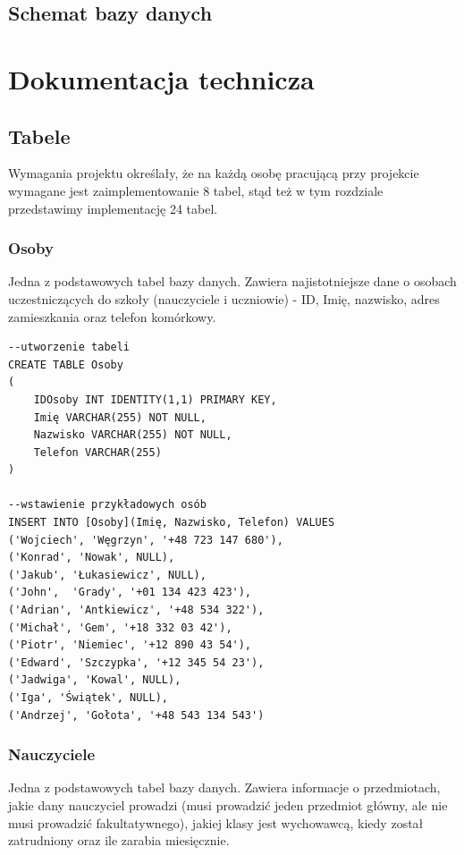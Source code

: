 \documentclass[60pt]{article}
\begin{document}
\subsection{Schemat bazy danych}

\newpage
\section{Dokumentacja technicza}

\subsection{Tabele}

Wymagania projektu określały, że na każdą osobę pracującą przy projekcie wymagane jest zaimplementowanie 8 tabel, stąd też w tym rozdziale przedstawimy implementację 24 tabel.

\subsubsection{Osoby}
Jedna z podstawowych tabel bazy danych. Zawiera najistotniejsze dane o osobach uczestniczących do szkoły (nauczyciele i uczniowie) - ID, Imię, nazwisko, adres zamieszkania oraz telefon komórkowy.

\begin{verbatim}
--utworzenie tabeli
CREATE TABLE Osoby
(
	IDOsoby INT IDENTITY(1,1) PRIMARY KEY,
	Imię VARCHAR(255) NOT NULL,
	Nazwisko VARCHAR(255) NOT NULL,
	Telefon VARCHAR(255)
)

--wstawienie przykładowych osób
INSERT INTO [Osoby](Imię, Nazwisko, Telefon) VALUES
('Wojciech', 'Węgrzyn', '+48 723 147 680'),
('Konrad', 'Nowak', NULL),
('Jakub', 'Łukasiewicz', NULL),
('John',  'Grady', '+01 134 423 423'),
('Adrian', 'Antkiewicz', '+48 534 322'),
('Michał', 'Gem', '+18 332 03 42'),
('Piotr', 'Niemiec', '+12 890 43 54'), 
('Edward', 'Szczypka', '+12 345 54 23'), 
('Jadwiga', 'Kowal', NULL), 
('Iga', 'Świątek', NULL), 
('Andrzej', 'Gołota', '+48 543 134 543')

\end{verbatim}

\subsubsection{Nauczyciele}
 Jedna z podstawowych tabel bazy danych. Zawiera informacje o przedmiotach, jakie dany nauczyciel prowadzi (musi prowadzić jeden przedmiot główny, ale nie musi prowadzić fakultatywnego), jakiej klasy jest wychowawcą, kiedy został zatrudniony oraz ile zarabia miesięcznie.
 
\end{document}
